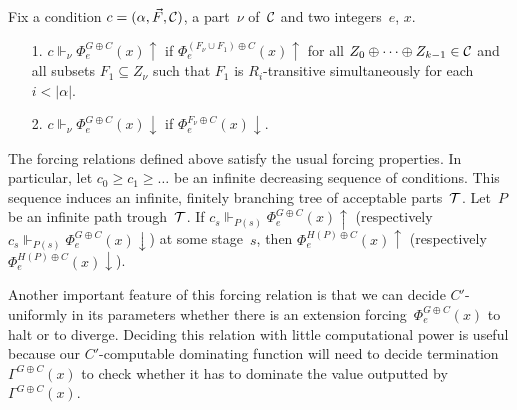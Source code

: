 \begin{definition}\label{def:em-comp-reduc-forcing-relation}
Fix a condition $c = (\alpha, \vec{F}, \mathcal{C})$, a part~$\nu$ of~$\mathcal{C}$ and two integers~$e$, $x$.
\begin{itemize}
	\item[1.] $c \Vdash_\nu \Phi_e^{G \oplus C}(x) \uparrow$ if $\Phi_e^{(F_\nu \cup F_1) \oplus C}(x) \uparrow$
	for all $Z_0 \oplus \dots \oplus Z_{k-1} \in \mathcal{C}$ and all subsets $F_1 \subseteq Z_\nu$
	such that $F_1$ is $R_i$-transitive simultaneously for each $i < |\alpha|$.
	\item[2.] $c \Vdash_\nu \Phi_e^{G \oplus C}(x) \downarrow$ if $\Phi_e^{F_\nu \oplus C}(x) \downarrow$.
\end{itemize}
\end{definition}

The forcing relations defined above satisfy the usual forcing properties.
In particular, let $c_0 \geq c_1 \geq \dots$ be an infinite decreasing
sequence of conditions. This sequence induces an infinite, finitely branching tree of acceptable parts~$\mathcal{T}$.
Let~$P$ be an infinite path trough~$\mathcal{T}$. If 
$c_s \Vdash_{P(s)} \Phi_e^{G \oplus C}(x) \uparrow$ (respectively $c_s \Vdash_{P(s)} \Phi_e^{G \oplus C}(x) \downarrow$)
at some stage~$s$, then $\Phi_e^{H(P) \oplus C}(x) \uparrow$ (respectively $\Phi_e^{H(P) \oplus C}(x) \downarrow$).

Another important feature of this forcing relation is that we can decide $C'$-uniformly in its parameters
whether there is an extension forcing~$\Phi^{G \oplus C}_e(x)$ to halt or to diverge. 
Deciding this relation with little computational power is useful because our $C'$-computable dominating function will
need to decide termination $\Gamma^{G \oplus C}(x)$ to check whether it has to dominate the value 
outputted by $\Gamma^{G \oplus C}(x)$.

